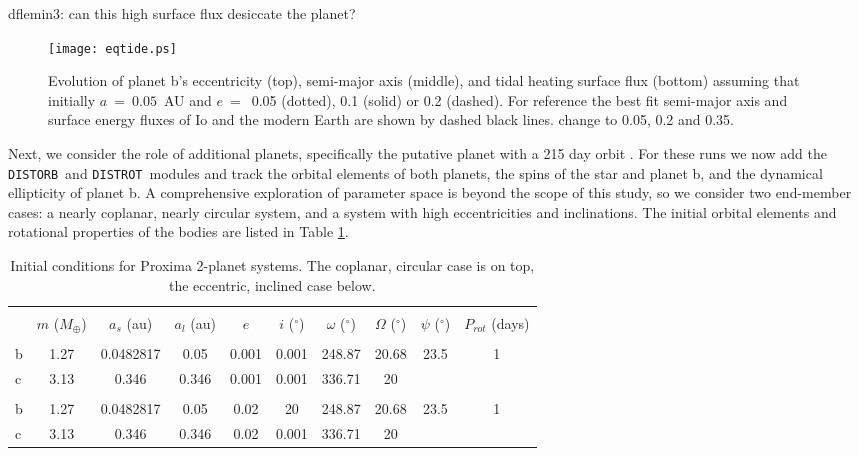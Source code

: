 \documentclass[preprint,12pt]{aastex}
\newcommand{\xxx}[1]{{\color{red} #1}} %
\def\distorb{\texttt{\footnotesize{DISTORB}}\xspace}
\def\distrot{\texttt{\footnotesize{DISTROT}}\xspace}
\begin{document}
\xxx{dflemin3: can this high surface flux desiccate the planet?}

\begin{figure} 
\begin{center}
\texttt{[image: eqtide.ps]}
\end{center}
\caption{Evolution of planet b's eccentricity (top), semi-major axis
  (middle), and tidal heating surface flux (bottom) assuming that
  initially $a~=~0.05$~AU and $e~=$~0.05 (dotted), 0.1 (solid) or 0.2
  (dashed). For reference the best fit semi-major axis and surface
  energy fluxes of Io and the modern Earth are shown by dashed black
  lines.\xxx{change to 0.05, 0.2 and 0.35.}}
\label{fig:eqtide}
\end{figure}

Next, we consider the role of additional planets, specifically the
putative planet with a 215 day orbit \citep{AngladaEscude16}. For
these runs we now add the \distorb~and \distrot~modules and track the
orbital elements of both planets, the spins of the star and planet b,
and the dynamical ellipticity of planet b. A comprehensive exploration
of parameter space is beyond the scope of this study, so we consider
two end-member cases: a nearly coplanar, nearly circular system, and a
system with high eccentricities and inclinations. The initial orbital
elements and rotational properties of the bodies are listed in Table \ref{tab:orbitic}.

\begin{table}[h]
\centering
\begin{tabular}{lccccccccc}
\hline\hline \\[-1.5ex]
& $m$ ($M_{\oplus}$)  & $a_s$ (au) & $a_l$ (au) & $e$ & $i$ ($^{\circ}$)
 & $\omega$ ($^{\circ}$) & $\Omega$ ($^{\circ}$) & $\psi$ ($^{\circ}$) & 
 $P_{rot}$ (days)\\[0.5ex]
\hline \\ [-1.5ex]
b & 1.27 & 0.0482817 & 0.05 & 0.001 & 0.001 & 248.87 & 20.68 & 23.5 & 1  \\
c & 3.13 & 0.346 & 0.346 & 0.001 & 0.001 & 336.71 & 20 & &  \\
\hline \\
b & 1.27 & 0.0482817 & 0.05 & 0.02 & 20 & 248.87 & 20.68 & 23.5 & 1  \\
c & 3.13 & 0.346 & 0.346 & 0.02 & 0.001 & 336.71 & 20 & &  \\
\end{tabular}
\caption{Initial conditions for Proxima 2-planet systems. The coplanar, 
  circular case is on top, the eccentric, inclined case below.}
\label{tab:orbitic}
\end{table}
\end{document}
